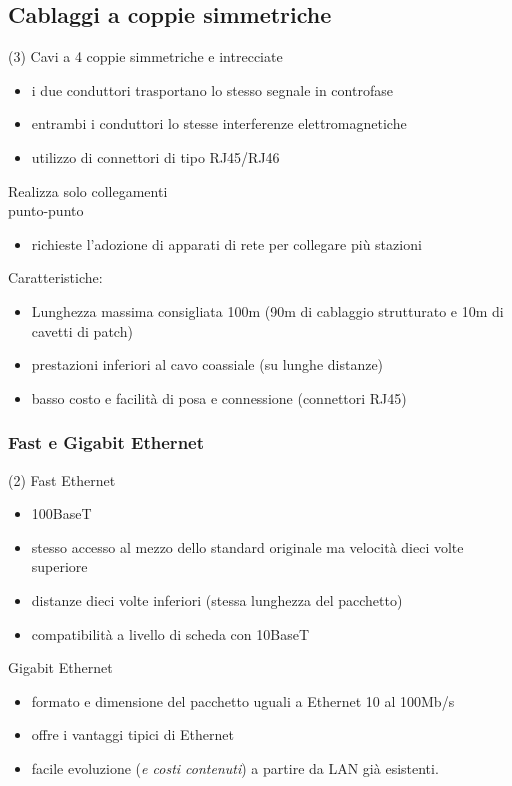 \documentclass{book}
\begin{document}
\subsection{Cablaggi a coppie simmetriche}
\begin{tasks}(3)
	\task Cavi a 4 coppie simmetriche e intrecciate
	\begin{itemize}
		\item i due conduttori trasportano lo stesso segnale in controfase
		\item entrambi i conduttori lo stesse interferenze elettromagnetiche
		\item utilizzo di connettori di tipo RJ45/RJ46
	\end{itemize}
	\task Realizza solo collegamenti\\ punto-punto
	\begin{itemize}
		\item richieste l'adozione di apparati di rete per collegare più
			stazioni
	\end{itemize}
	\task Caratteristiche:
	\begin{itemize}
		\item Lunghezza massima consigliata 100m (90m di cablaggio strutturato
			e 10m di cavetti di patch)
		\item prestazioni inferiori al cavo coassiale (su lunghe distanze)
		\item basso costo e facilità di posa e connessione (connettori RJ45)
	\end{itemize}
\end{tasks}
\subsubsection{Fast e Gigabit Ethernet}
\begin{tasks}(2)
	\task Fast Ethernet
	\begin{itemize}
		\item 100BaseT
		\item stesso accesso al mezzo dello standard originale ma velocità
			dieci volte superiore
		\item distanze dieci volte inferiori (stessa lunghezza del pacchetto)
		\item compatibilità a livello di scheda con 10BaseT
	\end{itemize}
	\task Gigabit Ethernet
	\begin{itemize}
		\item formato e dimensione del pacchetto uguali a Ethernet 10 al 100Mb/s
		\item offre i vantaggi tipici di Ethernet
		\item facile evoluzione (\textit{e costi contenuti}) a partire da LAN
			già esistenti.
	\end{itemize}
\end{tasks}
\end{document}
